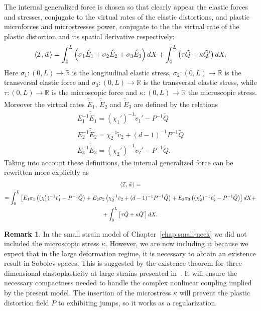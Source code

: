 \documentclass[a4paper,10pt,twoside]{amsbook}
\numberwithin{section}{chapter}
\numberwithin{equation}{chapter}
\theoremstyle{definition}
\newtheorem{rmk}[prop]{Remark}
\DeclarePairedDelimiter{\dual}{\langle}{\rangle}
\begin{document}
The internal generalized force is chosen so that clearly appear the elastic forces and stresses, conjugate to the virtual rates of the elastic distortions, and plastic microforces and microstresses power, conjugate to the the virtual rate of the plastic distortion and its spatial derivative respectively:
\[
\dual{\mathcal{I},\tilde w}=\int_0^L\left(\sigma_1\tilde{\dot E}_1+\sigma_2\tilde{\dot E}_2+\sigma_3\tilde{\dot E}_3\right)dX+\int_0^L\left(\tau\tilde{Q}+\kappa\tilde{Q}'\right)dX.
\]
Here $\sigma_1\colon(0,L)\to\mathbb{R}$ is the longitudinal elastic stress, $\sigma_2\colon(0,L)\to\mathbb{R}$ is the transversal elastic force and $\sigma_3\colon(0,L)\to\mathbb{R}$ is the transversal elastic stress, while $\tau\colon(0,L)\to\mathbb{R}$ is the microscopic force and $\kappa\colon(0,L)\to\mathbb{R}$ the microscopic stress. Moreover the virtual rates $\tilde{\dot E}_1$, $\tilde{\dot E}_2$ and $\tilde{\dot E}_3$ are defined by the relations
\begin{gather*}
E_1^{-1}\tilde{\dot E}_1=(\chi_1')^{-1}\tilde{v}_1'-P^{-1}\tilde{Q} \\
E_2^{-1}\tilde{\dot E}_2=\chi_2^{-1}\tilde{v}_2+(d-1)^{-1}P^{-1}\tilde{Q}\\
E_3^{-1}\tilde{\dot E}_3=(\chi_2')^{-1}\tilde{v}_2'-P^{-1}\tilde{Q}.
\end{gather*}
Taking into account these definitions, the internal generalized force can be rewritten more explicitly as
\begin{multline*}
\dual{\mathcal{I},\tilde w}=\\
=\int_0^L\left[E_1\sigma_1\left((\chi_1')^{-1}\tilde v_1'-P^{-1}\tilde Q\right)+E_2\sigma_2\left(\chi_2^{-1}\tilde v_2+(d-1)^{-1}P^{-1}\tilde Q\right)+E_3\sigma_3\left((\chi_2')^{-1}\tilde v_2'-P^{-1}\tilde Q\right)\right]dX+\\
+\int_0^L\left[\tau\tilde Q+\kappa\tilde Q'\right]dX.
\end{multline*}
\begin{rmk}
In the small strain model of Chapter~\ref{chap:small-neck} we did not included the microscopic stress $\kappa$. However, we are now including it because we expect that in the large deformation regime, it is necessary to obtain an existence result in Sobolev spaces. This is suggested by the existence theorem for three-dimensional elastoplasticity at large strains presented in~\cite{mielke}. It will ensure the necessary compactness needed to handle the complex nonlinear coupling implied by the present model. The insertion of the microstress $\kappa$ will prevent the plastic distortion field $P$ to exhibiting jumps, so it works as a regularization.
\end{rmk}
\end{document}
